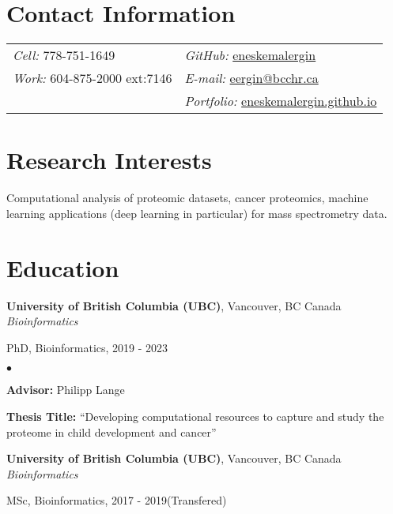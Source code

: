 \documentclass[margin,line]{res}
\newenvironment{list1}{
  \begin{list}{\ding{113}}{%
      \setlength{\itemsep}{0in}
      \setlength{\parsep}{0in} \setlength{\parskip}{0in}
      \setlength{\topsep}{0in} \setlength{\partopsep}{0in}
      \setlength{\leftmargin}{0.17in}}}{\end{list}}
\newenvironment{list2}{
  \begin{list}{$\bullet$}{%
      \setlength{\itemsep}{0in}
      \setlength{\parsep}{0in} \setlength{\parskip}{0in}
      \setlength{\topsep}{0in} \setlength{\partopsep}{0in}
      \setlength{\leftmargin}{0.2in}}}{\end{list}}
\begin{document}

\begin{resume}
\section{\sc Contact Information}
\vspace{.05in}
\begin{tabular}{@{}p{2in}p{4in}}
{\it Cell:} 778-751-1649               & \hfill {\it GitHub:}  \href{https://github.com/eneskemalergin}{eneskemalergin} \\
{\it Work:} 604-875-2000 ext:7146    & \hfill {\it E-mail:}  \href{mailto:eergin@bcchr.ca}{eergin@bcchr.ca}\\
                                    & \hfill {\it Portfolio:}  \href{eneskemalergin.github.io}{eneskemalergin.github.io} \\
\end{tabular}


\section{\sc Research Interests}
Computational analysis of proteomic datasets, cancer proteomics, machine learning applications (deep learning in particular) for mass spectrometry data.

\section{\sc Education}

{\bf University of British Columbia (UBC)}, Vancouver, BC Canada\\
{\em Bioinformatics}
\begin{list1}
\item[]  PhD, Bioinformatics, 2019 - 2023
\begin{list2}
\vspace*{.05in}
\item {\bf Advisor:}  Philipp Lange
\item {\bf Thesis Title:}  ``Developing computational resources to capture and study the proteome in child development and cancer''
\end{list2}
\end{list1}

{\bf University of British Columbia (UBC)}, Vancouver, BC Canada\\
{\em Bioinformatics}
\begin{list1}
\item[]  MSc, Bioinformatics, 2017 - 2019(Transfered)
\end{list1}


\end{resume}
\end{document}
